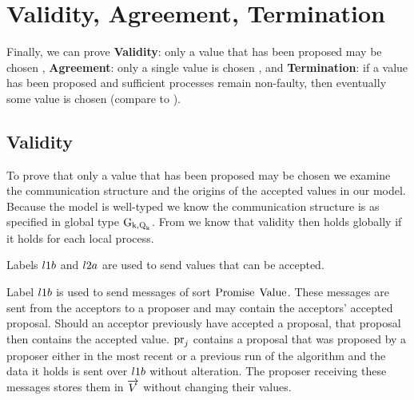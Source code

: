 \section{Validity, Agreement, Termination}
Finally, we can prove \textbf{Validity}: only a value that has been proposed may be chosen \cite{Lamport01}, \textbf{Agreement}: only a single value is chosen \cite{Lamport01}, and \textbf{Termination}: if a value has been proposed and sufficient processes remain non-faulty, then eventually some value is chosen (compare to \cite{Lamport06}).

\subsection{Validity}
To prove that only a value that has been proposed may be chosen we examine the communication structure and the origins of the accepted values in our model.
Because the model is well-typed we know the communication structure is as specified in global type $\operatorname{G_{k, \operatorname{Q}_{k}}}$.
From \cite{PetersEtal21} we know that validity then holds globally if it holds for each local process.

Labels $l1b$ and $l2a$ are used to send values that can be accepted.

Label $l1b$ is used to send messages of sort $\operatorname{Promise}\; \operatorname{Value}$.
These messages are sent from the acceptors to a proposer and may contain the acceptors' accepted proposal.
Should an acceptor previously have accepted a proposal, that proposal then contains the accepted value.
$\operatorname{pr}_{j}$ contains a proposal that was proposed by a proposer either in the most recent or a previous run of the algorithm and the data it holds is sent over $l1b$ without alteration.
The proposer receiving these messages stores them in $\overrightarrow{V}$ without changing their values.


